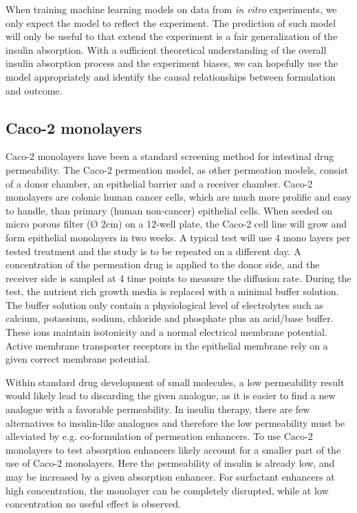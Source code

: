 When training machine learning models on data from \textit{in vitro} experiments, we only expect the model to reflect the experiment. The prediction of such model will only be useful to that extend the experiment is a fair generalization of the insulin absorption. With a sufficient theoretical understanding of the overall insulin absorption process and the experiment biases, we can hopefully use the model appropriately and identify the causal relationships between formulation and outcome.

\subsection{Caco-2 monolayers}
Caco-2 monolayers have been a standard screening method for intestinal drug permeability. The Caco-2 permeation model, as other permeation models, consist of a donor chamber, an epithelial barrier and a receiver chamber. Caco-2 monolayers are colonic human cancer cells, which are much more prolific and easy to handle, than primary (human non-cancer) epithelial cells. When seeded on micro porous filter (Ø 2cm) on a 12-well plate, the Caco-2 cell line will grow and form epithelial monolayers in two weeks. A typical test will use 4 mono layers per tested treatment and the study is to be repeated on a different day. A concentration of the permeation drug is applied to the donor side, and the receiver side is sampled at 4 time points to measure the diffusion rate. During the test, the nutrient rich growth media is replaced with a minimal buffer solution. The buffer solution only contain a physiological level of electrolytes such as calcium, potassium, sodium, chloride and phosphate plus an acid/base buffer. These ions maintain isotonicity and a normal electrical membrane potential. Active membrane transporter receptors in the epithelial membrane rely on a given correct membrane potential.

Within standard drug development of small molecules, a low permeability result would likely lead to discarding the given analogue, as it is easier to find a new analogue with a favorable permeability. In insulin therapy, there are few alternatives to insulin-like analogues and therefore the low permeability must be alleviated by e.g. co-formulation of permeation enhancers. To use Caco-2 monolayers to test absorption enhancers likely account for a smaller part of the use of Caco-2 monolayers. Here the permeability of insulin is already low, and may be increased by a given absorption enhancer. For surfactant enhancers at high concentration, the monolayer can be completely disrupted, while at low concentration no useful effect is observed.

